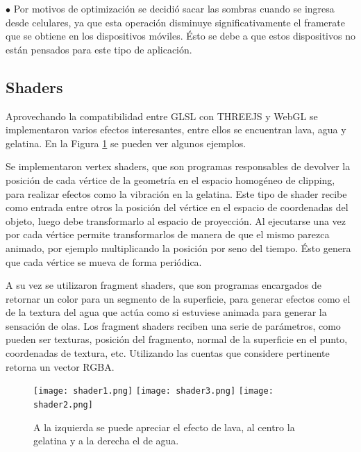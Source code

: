 \documentclass[12pt]{article}
\begin{document}
$\bullet$ Por motivos de optimización se decidió sacar las sombras cuando se ingresa desde celulares, ya que esta operación disminuye significativamente el framerate que se obtiene en los dispositivos móviles. Ésto se debe a que estos dispositivos no están pensados para este tipo de aplicación.

\clearpage
\subsection{Shaders}
\noindent Aprovechando la compatibilidad entre GLSL con THREEJS y WebGL se implementaron varios efectos interesantes, entre ellos se encuentran lava, agua y gelatina. En la Figura \ref{shader} se pueden ver algunos ejemplos.

Se implementaron vertex shaders, que son programas responsables de devolver la posición de cada vértice de la geometría en el espacio homogéneo de clipping, para realizar efectos como la vibración en la gelatina. Este tipo de shader recibe como entrada entre otros la posición del vértice en el espacio de coordenadas del objeto, luego debe transformarlo al espacio de proyección. Al ejecutarse una vez por cada vértice permite transformarlos de manera de que el mismo parezca animado, por ejemplo multiplicando la posición por seno del tiempo. Ésto genera que cada vértice se mueva de forma periódica.

A su vez se utilizaron fragment shaders, que son programas encargados de retornar un color para un segmento de la superficie, para generar efectos como el de la textura del agua que actúa como si estuviese animada para generar la sensación de olas. Los fragment shaders reciben una serie de parámetros, como pueden ser texturas, posición del fragmento, normal de la superficie en el punto, coordenadas de textura, etc. Utilizando las cuentas que considere pertinente retorna un vector RGBA.

\begin{figure}[h!]
\texttt{[image: shader1.png]}
\hfill
\texttt{[image: shader3.png]}
\hfill
\texttt{[image: shader2.png]}
\caption{ A la izquierda se puede apreciar el efecto de lava, al centro la gelatina y a la derecha el de agua.}
\label{shader}
\end{figure}
\end{document}
